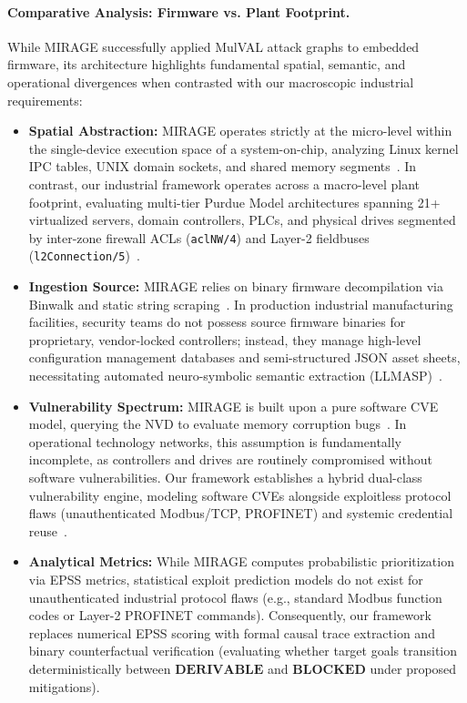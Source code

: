 \documentclass[target=mst,aauheader=aics,style=]{thud}
\begin{document}
\paragraph{Comparative Analysis: Firmware vs. Plant Footprint.}
While MIRAGE successfully applied MulVAL attack graphs to embedded firmware, its architecture highlights fundamental spatial, semantic, and operational divergences when contrasted with our macroscopic industrial requirements:
\begin{itemize}
    \item \textbf{Spatial Abstraction:} MIRAGE operates strictly at the micro-level within the single-device execution space of a system-on-chip, analyzing Linux kernel IPC tables, UNIX domain sockets, and shared memory segments~\cite{TayouriMIRAGE}. In contrast, our industrial framework operates across a macro-level plant footprint, evaluating multi-tier Purdue Model architectures spanning 21+ virtualized servers, domain controllers, PLCs, and physical drives segmented by inter-zone firewall ACLs (\texttt{aclNW/4}) and Layer-2 fieldbuses (\texttt{l2Connection/5})~\cite{SunderOT}.
    \item \textbf{Ingestion Source:} MIRAGE relies on binary firmware decompilation via Binwalk and static string scraping~\cite{TayouriMIRAGE}. In production industrial manufacturing facilities, security teams do not possess source firmware binaries for proprietary, vendor-locked controllers; instead, they manage high-level configuration management databases and semi-structured JSON asset sheets, necessitating automated neuro-symbolic semantic extraction (LLMASP)~\cite{alviano2025llmasp}.
    \item \textbf{Vulnerability Spectrum:} MIRAGE is built upon a pure software CVE model, querying the NVD to evaluate memory corruption bugs~\cite{TayouriMIRAGE}. In operational technology networks, this assumption is fundamentally incomplete, as controllers and drives are routinely compromised without software vulnerabilities. Our framework establishes a hybrid dual-class vulnerability engine, modeling software CVEs alongside exploitless protocol flaws (unauthenticated Modbus/TCP, PROFINET) and systemic credential reuse~\cite{StanExtended, SunderOT}.
    \item \textbf{Analytical Metrics:} While MIRAGE computes probabilistic prioritization via EPSS metrics, statistical exploit prediction models do not exist for unauthenticated industrial protocol flaws (e.g., standard Modbus function codes or Layer-2 PROFINET commands). Consequently, our framework replaces numerical EPSS scoring with formal causal trace extraction and binary counterfactual verification (evaluating whether target goals transition deterministically between $\mathbf{DERIVABLE}$ and $\mathbf{BLOCKED}$ under proposed mitigations).
\end{itemize}
\end{document}
